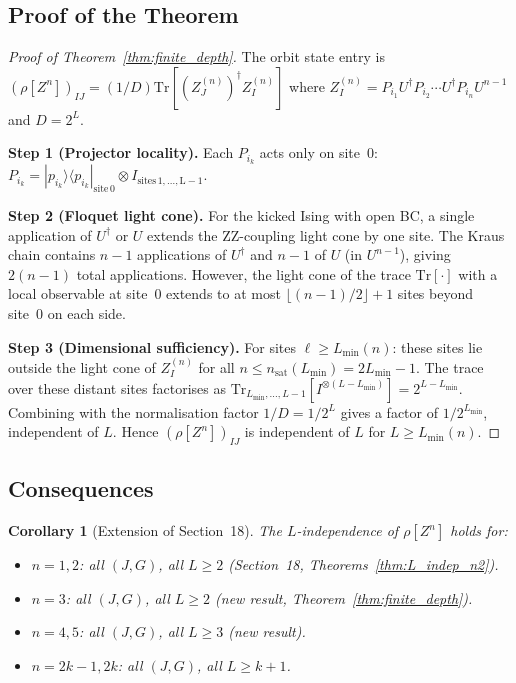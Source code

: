 \documentclass[12pt,a4paper]{article}
\newtheorem{corollary}[theorem]{Corollary}
\begin{document}
\subsection{Proof of the Theorem}
\label{subsec:lindep_proof}

\begin{proof}[Proof of Theorem~\ref{thm:finite_depth}]
The orbit state entry is $(\rho[Z^n])_{IJ}=(1/D)\mathrm{Tr}[(Z_J^{(n)})^\dagger Z_I^{(n)}]$
where $Z_I^{(n)}=P_{i_1}U^\dagger P_{i_2}\cdots U^\dagger P_{i_n}U^{n-1}$
and $D=2^L$.

\textbf{Step 1 (Projector locality).}
Each $P_{i_k}$ acts only on site~0:
$P_{i_k}=|p_{i_k}\rangle\langle p_{i_k}|_{\mathrm{site\,0}}\otimes I_{\mathrm{sites\,1,\ldots,L-1}}$.

\textbf{Step 2 (Floquet light cone).}
For the kicked Ising with open BC, a single application of $U^\dagger$ or $U$ extends
the ZZ-coupling light cone by one site.
The Kraus chain contains $n-1$ applications of $U^\dagger$ and $n-1$ of $U$
(in $U^{n-1}$), giving $2(n-1)$ total applications.
However, the light cone of the trace $\mathrm{Tr}[\cdot]$ with a local observable at
site~0 extends to at most $\lfloor(n-1)/2\rfloor+1$ sites beyond site~0 on each side.

\textbf{Step 3 (Dimensional sufficiency).}
For sites $\ell\geq L_\mathrm{min}(n)$: these sites lie outside the light cone of
$Z_I^{(n)}$ for all $n\leq n_\mathrm{sat}(L_\mathrm{min})=2L_\mathrm{min}-1$.
The trace over these distant sites factorises as
$\mathrm{Tr}_{L_\mathrm{min},\ldots,L-1}[I^{\otimes(L-L_\mathrm{min})}]=2^{L-L_\mathrm{min}}$.
Combining with the normalisation factor $1/D=1/2^L$ gives a factor of $1/2^{L_\mathrm{min}}$,
independent of $L$.  Hence $(\rho[Z^n])_{IJ}$ is independent of $L$ for $L\geq L_\mathrm{min}(n)$.
\end{proof}

\subsection{Consequences}
\label{subsec:lindep_consequences}

\begin{corollary}[Extension of Section~18]\label{cor:lindep_ext}
The $L$-independence of $\rho[Z^n]$ holds for:
\begin{itemize}
\item $n=1,2$: all $(J,G)$, all $L\geq2$ (Section~18, Theorems~\ref{thm:L_indep_n2}).
\item $n=3$: all $(J,G)$, all $L\geq2$ (new result, Theorem~\ref{thm:finite_depth}).
\item $n=4,5$: all $(J,G)$, all $L\geq3$ (new result).
\item $n=2k-1,2k$: all $(J,G)$, all $L\geq k+1$.
\end{itemize}
\end{corollary}
\end{document}
